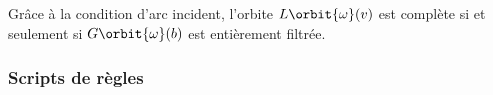 \begin{remarque}
	Grâce à la condition d'arc incident, l'orbite $L\orbit{\omega}(v)$ est complète si
	et seulement si $G\orbit{\omega}(b)$ est entièrement filtrée. %
\end{remarque}

\subsubsection[Scripts de règles]{Scripts de règles}
\label{sec:etat-art-model-regles-jerboa-scripts}

{\HUGE \todo{}}

